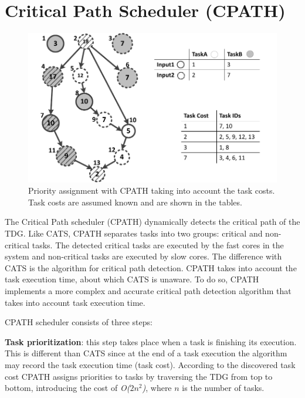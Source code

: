 \section{Critical Path Scheduler (CPATH)}
\label{sec.scheduling.cpath}
\begin{figure}[tr]
\includegraphics[width=\columnwidth]{images/cpath_priorities.pdf} 
\centering
\caption{Priority assignment with CPATH taking into account the task costs. Task costs are assumed known and are shown in the tables.}
\label{cpath}
\vspace{-0.5cm}
\end{figure}


The Critical Path scheduler (CPATH) dynamically detects the critical path of the TDG.
Like CATS, CPATH separates tasks into two groups: critical and non-critical tasks.
The detected critical tasks are executed by the fast cores in the system and non-critical tasks are executed by slow cores.
The difference with CATS is the algorithm for critical path detection.
CPATH takes into account the task execution time, about which CATS is unaware.
To do so, CPATH implements a more complex and accurate critical path detection algorithm that takes into account task execution time.

CPATH scheduler consists of three steps:

\textbf{Task prioritization}: this step takes place when a task is finishing its execution. This is different than CATS since at the end of a task execution the algorithm may record the task execution time (task cost).
According to the discovered task cost CPATH assigns priorities to tasks by traversing the TDG from top to bottom, introducing the cost of \textit{O($2n^2$)}, where \textit{$n$} is the number of tasks.

